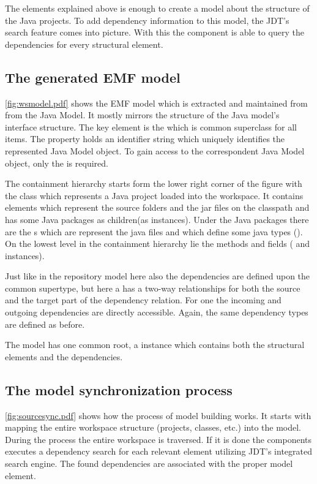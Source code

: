 The elements explained above is enough to create a model about the structure of
the Java projects. To add dependency information to this model, the JDT's search
feature comes into picture. With this the component is able to query the dependencies
for every structural element. 

\subsection{The generated EMF model}
\autoref{fig:wsmodel.pdf} shows the EMF model which is extracted and maintained
from from the Java Model. It mostly mirrors the structure of the Java model's
interface structure. The key element is the  which is common
superclass for all items. The  property holds an identifier string
which uniquely identifies the represented Java Model object. To gain access to
the correspondent Java Model object, only the  is
required.

The containment hierarchy starts form the lower right corner of the figure with
the  class which represents a Java project loaded into the
workspace. It contains  elements which represent the
source folders and the jar files on the classpath and has some Java packages as
children(as  instances). Under the Java packages there
are the s which are represent the java files and which
define some java types (). On the lowest level in the containment
hierarchy lie the methods and fields ( and 
instances).

Just like in the repository model here also the dependencies are defined upon
the common supertype, but here a  has a two-way relationships
for both the source and the target part of the dependency relation. For one
 the incoming and outgoing dependencies are directly
accessible. Again, the same dependency types are defined as before.

The model has one common root, a  instance which contains both
the structural elements and the dependencies.

\subsection{The model synchronization process}
\autoref{fig:sourcesync.pdf} shows how the process  of model building works. It
starts with mapping the entire workspace structure (projects, classes, etc.)
into the model. During the process the entire workspace is traversed. If it is 
done the components executes a dependency search for each relevant element 
utilizing JDT's integrated search engine. The found dependencies are associated 
with the proper model element.


